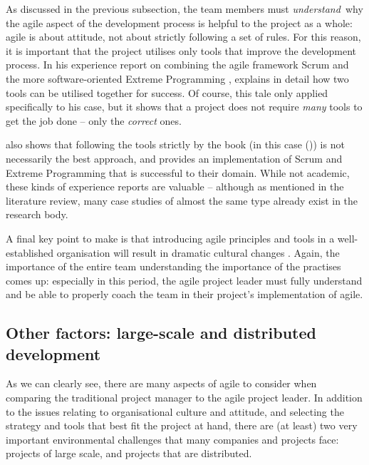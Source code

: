 As discussed in the previous subsection, the team members must \emph{understand} why the agile aspect of the development process is helpful to the project as a whole: agile is about attitude, not about strictly following a set of rules. For this reason, it is important that the project utilises only tools that improve the development process. In his \citeyear{warstory} experience report on combining the agile framework Scrum \autocite{schwaber:scrum} and the more software-oriented Extreme Programming \autocite{beck:extreme} , \citeauthor{warstory} explains in detail how two tools can be utilised together for success. Of course, this tale only applied specifically to his case, but it shows that a project does not require \emph{many} tools to get the job done – only the \emph{correct} ones.

\citeauthor{warstory} also shows that following the tools strictly by the book (in this case \citeauthor{schwaber:scrum} (\citeyear{schwaber:scrum})) is not necessarily the best approach, and provides an implementation of Scrum and Extreme Programming that is successful to their domain. While not academic, these kinds of experience reports are valuable – although as mentioned in the literature review, many case studies of almost the same type already exist in the research body.

A final key point to make is that introducing agile principles and tools in a well-established organisation will result in dramatic cultural changes \autocite{nhn:agileadoption}. Again, the importance of the entire team understanding the importance of the practises comes up: especially in this period, the agile project leader must fully understand and be able to properly coach the team in their project's implementation of agile.

\subsection{Other factors: large-scale and distributed development}

As we can clearly see, there are many aspects of agile to consider when comparing the traditional project manager to the agile project leader. In addition to the issues relating to organisational culture and attitude, and selecting the strategy and tools that best fit the project at hand, there are (at least) two very important environmental challenges that many companies and projects face: projects of large scale, and projects that are distributed.

